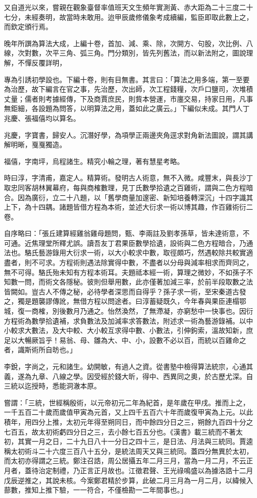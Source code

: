 \begin{pinyinscope}
又自道光以來，嘗親在觀象臺督率值班天文生頻年實測黃、赤大距為二十三度二十七分，未經奏明，故當時未敢用。迨甲辰歲修儀象考成續編，監臣即取此數上之，而欽定頒行焉。

晚年所譔為算法大成，上編十卷，首加、減、乘、除，次開方、句股，次比例、八線，次對數，次平三角、弧三角。門分類別，皆先列舊法，而以新法附之，圖說理解，不憚反覆詳明，

專為引誘初學設也。下編十卷，則有目無書。其言曰：「算法之用多端，第一至要為治歷，故下編言在官之事，先治歷，次出師，次工程錢糧，次戶口鹽司，次堆積丈量；儒者則考據經傳，下及商賈庶民，則貲本營運，市廛交易，持家日用，凡事無鉅細，各設題為問答，以明算法之用，蓋如此之廣云。」下編似未成。其門人丁兆慶、張福僖均以算名。

兆慶，字寶書，歸安人。沉潛好學，為項學正兩邊夾角逕求對角新法圖說，謂其講解明晰，戛戛獨造。

福僖，字南坪，烏程諸生。精究小輪之理，著有慧星考略。

時曰淳，字清甫，嘉定人。精算術。發明古人術意，無不入微。咸豐末，與長沙丁取忠同客胡林翼幕府，每與商榷數理，見丁氏數學拾遺之百雞術，謂與二色方程暗合。因為廣衍，立二十八題，以「舊學商量加邃密、新知培養轉深沉」十四字識其上下，為十四耦。諸題皆借方程為本術，並述大衍求一術以博其趣，作百雞術衍二卷。

自序略曰：「張丘建算經雞翁雞母題問，甄、李兩註及劉孝孫草，皆未達術意，不可通。近焦理堂所釋尤誤。讀吾友丁君果臣數學拾遺，設術與二色方程暗合，乃通法也。駱氏藝游錄用大衍求一術，以大小較求中數，取徑頗巧，然遇較除共較實適盡者，則不可求。方程術則遇法除實得中數，不盡者以分母與減率相求而齊同之，無不可得。駱氏殆未知有方程本術耳。夫題祗本經一術，算理之微妙，不如孫子不知數一問，而術文各隱秘。彼則但舉用數，此亦僅著加減三率，於前半段取數之法皆闕如。豈古人不傳之秘，必待學者深思而自得乎？孫子求一術，至宋秦道古發之，獨是題襲謬傳訛，無借方程以問途者。曰淳蓄疑既久，今年春與果臣連榻鄂城，復一商榷，別後數月乃通之。怡然渙然，了無滯凝，亦窮愁中一快事也。因衍方程術為數學拾遺補，求負數法及加減率求答數法，附述求一術為藝游錄補。以中小較求大數法，及大中較、大小較互求得中數、小數法，引伸鉤索，溫故知新，庶足以大暢厥旨乎！易翁、母、雛為大、中、小，設數不必以百，而統以百雞命之者，識斯術所自昉也。」

李銳，字尚之，元和諸生。幼開敏，有過人之資。從書塾中檢得算法統宗，心通其義，遂為九章、八線之學。因受經於錢大昕，得中、西異同之奧，於古歷尤深。自三統以迄授時，悉能洞澈本原。

嘗謂：「三統，世經稱殷術，以元帝初元二年為紀首，是年歲在甲戌。推而上之，一千五百二十歲而歲值甲寅為元首，又上四千五百六十年而歲復甲寅為上元。以此積年，用四分上推，太初元年得至朔同日，而中餘四分日之三，朔餘九百四十分之七百五，故太初術虧四分日之三，去小餘七百五分也。《漢書》載三統而不著太初，其實一月之日，二十九日八十一分日之四十三，是日法、月法與三統同。賈逵稱太初術斗二十六度三百八十五分，是統法周天又與三統同。蓋四分無異於太初，而太初亦得謂之三統。鄭注召誥，周公居攝五年二月三月，當為一月二月，不云正月者，蓋待治定制禮，乃正言正月故也。江徵君聲、王光祿鳴盛以為據洛誥十二月戊辰逆推之，其說未核。今案鄭君精於步算，此破二月三月為一月二月，以緯候入蔀數，推知上推下驗，一一符合，不僅檢勘一二年間事也。」


\end{pinyinscope}
